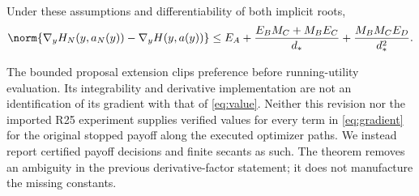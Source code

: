 \begin{proposition}\label{prop:gradient}
Under these assumptions and differentiability of both implicit roots,
\begin{equation}
 \norm{\nabla_y H_N(y,a_N(y))-\nabla_y H(y,a(y))}
 \leq E_A+\frac{E_BM_C+M_BE_C}{d_*}+\frac{M_BM_CE_D}{d_*^2}.\label{eq:gradient}
\end{equation}
\end{proposition}
The bounded proposal extension clips preference before running-utility evaluation. Its integrability and derivative implementation are not an identification of its gradient with that of \eqref{eq:value}. Neither this revision nor the imported R25 experiment supplies verified values for every term in \eqref{eq:gradient} for the original stopped payoff along the executed optimizer paths. We instead report certified payoff decisions and finite secants as such. The theorem removes an ambiguity in the previous derivative-factor statement; it does not manufacture the missing constants.
